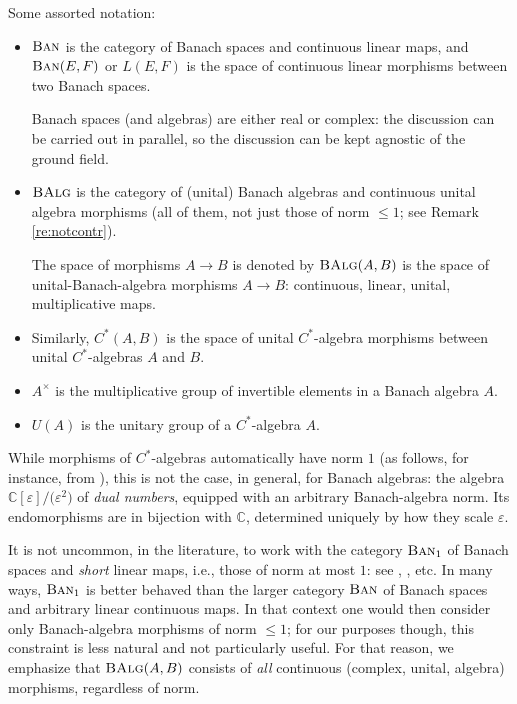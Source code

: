 \documentclass[10pt,a4paper]{amsart}
\numberwithin{equation}{section}
\newcommand\bC{{\mathbb C}}
\newcommand{\cat}[1]{\text{\sc #1}}
\begin{document}
Some assorted notation:
\begin{itemize}\itemsep=0pt
\item $\cat{Ban}$ is the category of Banach spaces and continuous linear maps, and $\cat{Ban}(E,F)$ or $L(E,F)$ is the space of continuous linear morphisms between two Banach spaces.

 Banach spaces (and algebras) are either real or complex: the discussion can be carried out in parallel, so the discussion can be kept agnostic of the ground field.

\item $\cat{BAlg}$ is the category of (unital) Banach algebras and continuous unital algebra morphisms (all of them, not just those of norm $\le 1$; see Remark \ref{re:notcontr}).

 The space of morphisms $A\to B$ is denoted by $\cat{BAlg}(A,B)$ is the space of unital-Banach-algebra morphisms $A\to B$: continuous, linear, unital, multiplicative maps.
\item Similarly, $C^*(A,B)$ is the space of unital $C^*$-algebra morphisms between unital $C^*$-al\-ge\-bras $A$ and $B$.
\item $A^{\times}$ is the multiplicative group of invertible elements in a Banach algebra $A$.
\item $U(A)$ is the unitary group of a $C^*$-algebra $A$.
\end{itemize}

\begin{Remark}\label{re:notcontr}
 While morphisms of $C^*$-algebras automatically have norm $1$ (as follows, for instance, from \cite[Proposition 1.6.2]{arv}), this is not the case, in general, for Banach algebras: the algebra $\bC[\varepsilon]/\big(\varepsilon^2\big)$ of {\it dual numbers}, equipped with an arbitrary Banach-algebra norm. Its endomorphisms are in bijection with $\bC$, determined uniquely by how they scale $\varepsilon$.

 It is not uncommon, in the literature, to work with the category $\cat{Ban}_1$ of Banach spaces and {\it short} linear maps, i.e., those of norm at most $1$: see \cite[Example 1.48]{ar}, \cite{poth}, etc. In many ways, $\cat{Ban}_1$ is better behaved than the larger category $\cat{Ban}$ of Banach spaces and arbitrary linear continuous maps. In that context one would then consider only Banach-algebra morphisms of norm $\le 1$; for our purposes though, this constraint is less natural and not particularly useful. For that reason, we emphasize that $\cat{BAlg}(A,B)$ consists of {\it all} continuous (complex, unital, algebra) morphisms, regardless of norm.
\end{Remark}
\end{document}
